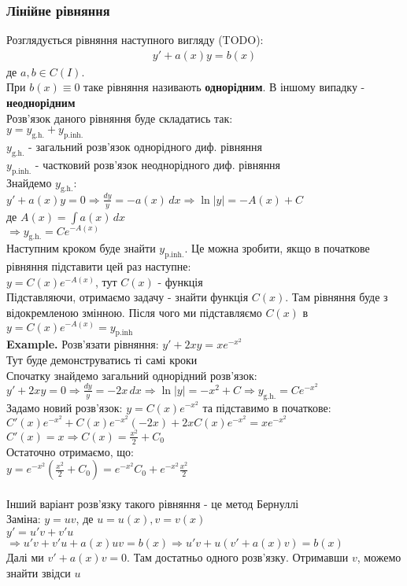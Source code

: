 \documentclass[a4paper, 14pt]{extarticle}
\def\huge{\displaystyle}
\def\bigline{\vspace{5mm}\\}
\begin{document}
	\subsubsection{Лінійне рівняння}
	Розглядується рівняння наступного вигляду (TODO):
	\begin{align*}
	y' + a(x)y = b(x)
	\end{align*}
	де $a,b \in C(I)$.\\
	При $b(x) \equiv 0$ таке рівняння називають \textbf{однорідним}. В іншому випадку - \textbf{неоднорідним}\\
	Розв'язок даного рівняння буде складатись так:\\ $y = y_{\textrm{g.h.}} + y_{\textrm{p.inh.}}$\\
	$y_{\textrm{g.h.}}$ - загальний розв'язок однорідного диф. рівняння\\
	$y_{\textrm{p.inh.}}$ - частковий розв'язок неоднорідного диф. рівняння\\
	Знайдемо $y_{\textrm{g.h.}}$:\\
	$y'+a(x)y=0 \Rightarrow \huge \frac{dy}{y} = -a(x)\,dx \Rightarrow \ln |y| = -A(x) + C$\\ де $\huge A(x) = \int a(x)\,dx$\\
	$\huge \Rightarrow y_{\textrm{g.h.}} = Ce^{-A(x)}$\\
	Наступним кроком буде знайти $y_{\textrm{p.inh.}}$. Це можна зробити, якщо в початкове рівняння підставити цей раз наступне:\\
	$\huge y = C(x)e^{-A(x)}$, тут $C(x)$ - функція\\
	Підставляючи, отримаємо задачу - знайти функція $C(x)$. Там рівняння буде з відокремленою змінною. Після чого ми підставляємо $C(x)$ в\\ $y = C(x)e^{-A(x)} = y_{\textrm{p.inh}}$
	\bigline
	\textbf{Example.} Розв'язати рівняння: $\huge y' + 2xy = xe^{-x^2}$\\
	Тут буде демонструватись ті самі кроки\\
	Спочатку знайдемо загальний однорідний розв'язок:\\
	$y'+2xy=0 \Rightarrow \huge \frac{dy}{y} = -2x \,dx \Rightarrow \ln |y| = -x^2 + C \Rightarrow y_{\textrm{g.h.}} = Ce^{-x^2}$\\
	Задамо новий розв'язок: $y = C(x)e^{-x^2}$ та підставимо в початкове:\\
	$C'(x)e^{-x^2} + C(x)e^{-x^2}(-2x) + 2xC(x)e^{-x^2} = xe^{-x^2}$\\
	$C'(x) = x \Rightarrow \huge C(x) = \frac{x^2}{2} + C_0$\\
	Остаточно отримаємо, що:\\
	$\huge y = e^{-x^2} \left(\frac{x^2}{2} + C_0 \right) = e^{-x^2}C_0 + e^{-x^2} \frac{x^2}{2}$\\
	\bigline
	Інший варіант розв'язку такого рівняння - це метод Бернуллі\\
	Заміна: $y = uv$, де $u=u(x), v=v(x)$\\
	$y' = u'v+v'u$\\
	$\Rightarrow u'v + v'u + a(x)uv = b(x) \Rightarrow u'v + u(v'+a(x)v)=b(x)$\\
	Далі ми $v'+a(x)v = 0$. Там достатньо одного розв'язку. Отримавши $v$, можемо знайти звідси $u$\\
	
\end{document}

